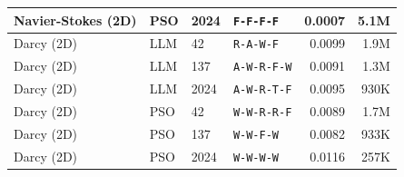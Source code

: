 \begin{tabular}{llllrr}
Navier-Stokes (2D) & PSO & 2024 & \texttt{F-F-F-F} & 0.0007 & 5.1M \\
\midrule
Darcy (2D) & LLM & 42 & \texttt{R-A-W-F} & 0.0099 & 1.9M \\
Darcy (2D) & LLM & 137 & \texttt{A-W-R-F-W} & 0.0091 & 1.3M \\
Darcy (2D) & LLM & 2024 & \texttt{A-W-R-T-F} & 0.0095 & 930K \\
Darcy (2D) & PSO & 42 & \texttt{W-W-R-R-F} & 0.0089 & 1.7M \\
Darcy (2D) & PSO & 137 & \texttt{W-W-F-W} & 0.0082 & 933K \\
Darcy (2D) & PSO & 2024 & \texttt{W-W-W-W} & 0.0116 & 257K \\
\bottomrule
\end{tabular}
